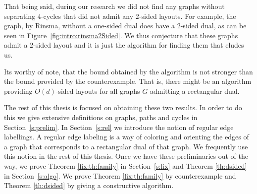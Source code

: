   That being said, during our research we did not find any graphs without separating $4$-cycles that did not admit any $2$-sided layouts.
  For example, the graph, by Rinsma, without a one-sided dual does have a $2$-sided dual, as can be seen in Figure~\ref{fig:intro:rinsma2Sided}.
  We thus conjecture that these graphs admit a $2$-sided layout and it is just the algorithm for finding them that eludes us.

  Its worthy of note, that the bound obtained by the algorithm is not stronger than the bound provided by the counterexample. That is, there might be an algorithm providing $O(d)$-sided layouts for all graphs $G$ admitting a rectangular dual.

  The rest of this thesis is focused on obtaining these two results.
  In order to do this we give extensive definitions on graphs, paths and cycles in Section~\ref{s:prelim}. In Section~\ref{s:rel} we introduce the notion of regular edge labellings.  A regular edge labeling is a way of coloring and orienting the edges of a graph that corresponds to a rectangular dual of that graph.
  We frequently use this notion in the rest of this thesis.
  Once we have these preliminaries out of the way, we prove Theorem \ref{fix:th:family} in Section~\ref{s:fix} and Theorem \ref{th:dsided} in Section~\ref{s:algo}. We prove Theorem \ref{fix:th:family} by counterexample and Theorem \ref{th:dsided} by giving a constructive algorithm.
